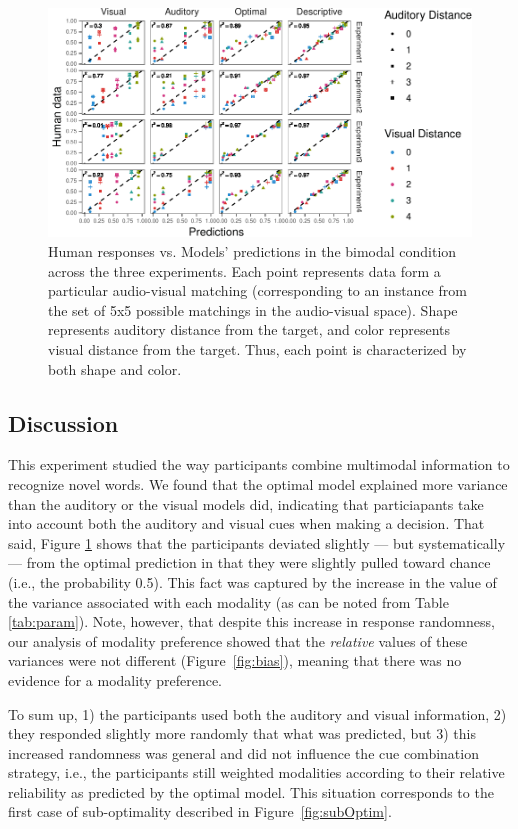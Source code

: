 \documentclass[english,,man,floatsintext]{apa6}
\theoremstyle{definition}
\theoremstyle{definition}
\theoremstyle{definition}
\theoremstyle{remark}
\begin{document}
\begin{figure}[!h]
\includegraphics[width=\textwidth]{ms_files/figure-latex/bimodal-1} \caption{Human responses vs. Models' predictions in the bimodal condition across the three experiments. Each point represents data form a particular audio-visual matching (corresponding to an instance from the set of 5x5 possible matchings in the audio-visual space). Shape represents auditory distance from the target, and color represents visual distance from the target. Thus, each point is characterized by both  shape and color.}\label{fig:bimodal}
\end{figure}

\subsection{Discussion}\label{discussion}

This experiment studied the way participants combine multimodal
information to recognize novel words. We found that the optimal model
explained more variance than the auditory or the visual models did,
indicating that particiapants take into account both the auditory and
visual cues when making a decision. That said, Figure \ref{fig:bimodal}
shows that the participants deviated slightly --- but systematically---
from the optimal prediction in that they were slightly pulled toward
chance (i.e., the probability 0.5). This fact was captured by the
increase in the value of the variance associated with each modality (as
can be noted from Table \ref{tab:param}). Note, however, that despite
this increase in response randomness, our analysis of modality
preference showed that the \emph{relative} values of these variances
were not different (Figure~\ref{fig:bias}), meaning that there was no
evidence for a modality preference.

To sum up, 1) the participants used both the auditory and visual
information, 2) they responded slightly more randomly that what was
predicted, but 3) this increased randomness was general and did not
influence the cue combination strategy, i.e., the participants still
weighted modalities according to their relative reliability as predicted
by the optimal model. This situation corresponds to the first case of
sub-optimality described in Figure~\ref{fig:subOptim}.
\end{document}
